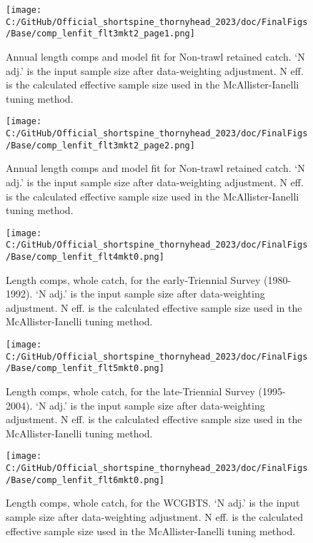 \documentclass[11pt,
  english,
  letterpaper,
]{article}
\begin{document}
\begin{figure}
\centering
\texttt{[image: C:/GitHub/Official\_shortspine\_thornyhead\_2023/doc/FinalFigs/Base/comp\_lenfit\_flt3mkt2\_page1.png]}
\caption{Annual length comps and model fit for Non-trawl retained catch. `N adj.' is the input sample size after data-weighting adjustment. N eff. is the calculated effective sample size used in the McAllister-Ianelli tuning method.\label{fig:nontrawl_comps_1}}
\end{figure}

\begin{figure}
\centering
\texttt{[image: C:/GitHub/Official\_shortspine\_thornyhead\_2023/doc/FinalFigs/Base/comp\_lenfit\_flt3mkt2\_page2.png]}
\caption{Annual length comps and model fit for Non-trawl retained catch. `N adj.' is the input sample size after data-weighting adjustment. N eff. is the calculated effective sample size used in the McAllister-Ianelli tuning method.\label{fig:nontrawl_comps_2}}
\end{figure}

\begin{figure}
\centering
\texttt{[image: C:/GitHub/Official\_shortspine\_thornyhead\_2023/doc/FinalFigs/Base/comp\_lenfit\_flt4mkt0.png]}
\caption{Length comps, whole catch, for the early-Triennial Survey (1980-1992). `N adj.' is the input sample size after data-weighting adjustment. N eff. is the calculated effective sample size used in the McAllister-Ianelli tuning method.\label{fig:fits_etri}}
\end{figure}

\begin{figure}
\centering
\texttt{[image: C:/GitHub/Official\_shortspine\_thornyhead\_2023/doc/FinalFigs/Base/comp\_lenfit\_flt5mkt0.png]}
\caption{Length comps, whole catch, for the late-Triennial Survey (1995-2004). `N adj.' is the input sample size after data-weighting adjustment. N eff. is the calculated effective sample size used in the McAllister-Ianelli tuning method.\label{fig:fits_ltri}}
\end{figure}

\begin{figure}
\centering
\texttt{[image: C:/GitHub/Official\_shortspine\_thornyhead\_2023/doc/FinalFigs/Base/comp\_lenfit\_flt6mkt0.png]}
\caption{Length comps, whole catch, for the WCGBTS. `N adj.' is the input sample size after data-weighting adjustment. N eff. is the calculated effective sample size used in the McAllister-Ianelli tuning method.\label{fig:fits_wcgbts}}
\end{figure}
\end{document}
